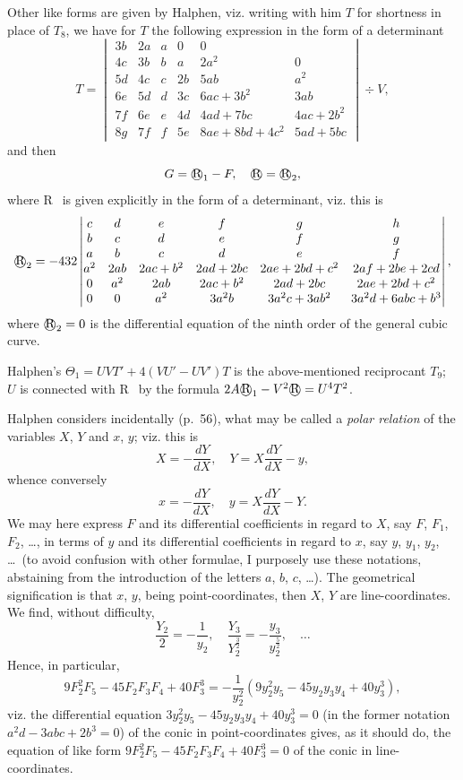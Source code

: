 \documentclass[11pt,a4paper]{book}
\begin{document}
{{{Other like forms are given by Halphen, viz.
writing with him $T$ for shortness in place of $T_8$, we have for $T$ the following expression in the form of a determinant
\[
T = \begin{vmatrix}
3b & 2a & a & 0 & 0 \\
4c & 3b & b & a & 2a^2 & 0 \\
5d & 4c & c & 2b & 5ab & a^2 \\
6e & 5d & d & 3c & 6ac + 3b^2 & 3ab \\
7f & 6e & e & 4d & 4ad + 7bc & 4ac + 2b^2 \\
8g & 7f & f & 5e & 8ae + 8bd + 4c^2 & 5ad + 5bc
\end{vmatrix} \div V,
\]
and then
\[
G = \text{\textcircled{R}}_1 - F, \quad \text{\textcircled{R}} = \text{\textcircled{R}}_2,
\]
where \textcircled{R}\ is given explicitly in the form of a determinant, viz.
this is
\[
\text{\textcircled{R}}_2 = -432 \begin{vmatrix}
c & d & e & f & g & h \\
b & c & d & e & f & g \\
a & b & c & d & e & f \\
a^2 & 2ab & 2ac+b^2 & 2ad+2bc & 2ae+2bd+c^2 & 2af+2be+2cd \\
0 & a^2 & 2ab & 2ac+b^2 & 2ad+2bc & 2ae+2bd+c^2 \\
0 & 0 & a^2 & 3a^2b & 3a^2c+3ab^2 & 3a^2d+6abc+b^3
\end{vmatrix},
\]
where $\text{\textcircled{R}}_2 = 0$ is the differential equation of the ninth order of the general cubic curve.

Halphen's $\Theta_1 = UVT' + 4(VU' - UV')T$ is the above-mentioned reciprocant $T_9$; $U$ is connected with \textcircled{R}\ by the formula $2A\text{\textcircled{R}}_1 - V^2\text{\textcircled{R}} = U^4T^2$.

Halphen considers incidentally (p.~56), what may be called a \textit{polar relation} of the variables $X$, $Y$ and $x$, $y$; viz.
this is
\[
X = -\frac{dY}{dX}, \quad Y = X\frac{dY}{dX} - y,
\]
whence conversely
\[
x = -\frac{dY}{dX}, \quad y = X\frac{dY}{dX} - Y.
\]
We may here express $F$ and its differential coefficients in regard to $X$, say $F$, $F_1$, $F_2$, \dots, in terms of $y$ and its differential coefficients in regard to $x$, say $y$, $y_1$, $y_2$, \dots\ (to avoid confusion with other formulae, I purposely use these notations, abstaining from the introduction of the letters $a$, $b$, $c$, \dots).
The geometrical signification is that $x$, $y$, being point-coordinates, then $X$, $Y$ are line-coordinates.
We find, without difficulty,
\[
\frac{Y_2}{2} = -\frac{1}{y_2}, \quad \frac{Y_3}{Y_2^{\frac{3}{2}}} = -\frac{y_3}{y_2^{\frac{5}{2}}}, \quad \dots
\]
Hence, in particular,
\[
9F_2^2F_5 - 45F_2F_3F_4 + 40F_3^3 = -\frac{1}{y_2^2}(9y_2^2y_5 - 45y_2y_3y_4 + 40y_3^3),
\]
viz.
the differential equation $3y_2^2y_5 - 45y_2y_3y_4 + 40y_3^3 = 0$ (in the former notation $a^2d - 3abc + 2b^3 = 0$) of the conic in point-coordinates gives, as it should do, the equation of like form $9F_2^2F_5 - 45F_2F_3F_4 + 40F_3^3 = 0$ of the conic in line-coordinates.

}}}
\end{document}
